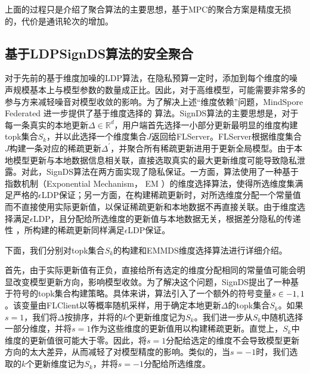 \documentclass[letterpaper,10pt,english]{sphinxmanual}
\begin{document}
\sphinxAtStartPar
上面的过程只是介绍了聚合算法的主要思想，基于MPC的聚合方案是精度无损的，代价是通讯轮次的增加。


\subsection{基于LDP\sphinxhyphen{}SignDS算法的安全聚合}
\label{\detokenize{chapter_federated_learning/privacy_encryption_algorithm:ldp-signds}}
\sphinxAtStartPar
对于先前的基于维度加噪的LDP算法，在隐私预算一定时，添加到每个维度的噪声规模基本上与模型参数的数量成正比。因此，对于高维模型，可能需要非常多的参与方来减轻噪音对模型收敛的影响。为了解决上述“维度依赖”问题，MindSpore
Federated 进一步提供了基于维度选择的
算法。SignDS算法的主要思想是，对于每一条真实的本地更新\(\Delta\in\mathbb{R}^{d}\)，用户端首先选择一小部分更新最明显的维度构建topk集合\(S_k\)，并以此选择一个维度集合\(J\)返回给FL\sphinxhyphen{}Server。FL\sphinxhyphen{}Server根据维度集合\(J\)构建一条对应的稀疏更新\(\Delta^\prime\)，并聚合所有稀疏更新进用于更新全局模型。由于本地模型更新与本地数据信息相关联，直接选取真实的最大更新维度可能导致隐私泄露。对此，SignDS算法在两方面实现了隐私保证。一方面，算法使用了一种基于指数机制（Exponential
Mechanism， EM
）的维度选择算法，使得所选维度集满足严格的\(\epsilon\)\sphinxhyphen{}LDP保证；另一方面，在构建稀疏更新时，对所选维度分配一个常量值而不直接使用实际更新值，以保证稀疏更新和本地数据不再直接关联。由于维度选择满足\(\epsilon\)\sphinxhyphen{}LDP，且分配给所选维度的更新值与本地数据无关，根据差分隐私的传递性
，所构建的稀疏更新同样满足\(\epsilon\)\sphinxhyphen{}LDP保证。

\sphinxAtStartPar
下面，我们分别对topk集合\(S_k\)的构建和EM\sphinxhyphen{}MDS维度选择算法进行详细介绍。

\sphinxAtStartPar
首先，由于实际更新值有正负，直接给所有选定的维度分配相同的常量值可能会明显改变模型更新方向，影响模型收敛。为了解决这个问题，SignDS提出了一种基于符号的topk集合构建策略。具体来讲，算法引入了一个额外的符号变量\(s\in\\{-1,1\\}\)。该变量由FL\sphinxhyphen{}Client以等概率随机采样，用于确定本地更新\(\Delta\)的topk集合\(S_k\)。如果\(s=1\)，我们将\(\Delta\)按排序，并将的\(k\)个更新维度记为\(S_k\)。我们进一步从\(S_k\)中随机选择一部分维度，并将\(s=1\)作为这些维度的更新值用以构建稀疏更新。直觉上，\(S_k\)中维度的更新值很可能大于零。因此，将\(s=1\)分配给选定的维度不会导致模型更新方向的太大差异，从而减轻了对模型精度的影响。类似的，当\(s=-1\)时，我们选取的\(k\)个更新维度记为\(S_k\)，并将\(s=-1\)分配给所选维度。
\end{document}
